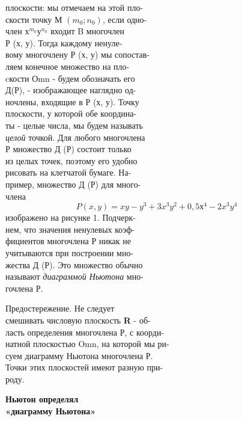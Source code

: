 \documentclass[12pt]{article}
\begin{document}
\begin{multicols}{2}
\begin{flushleft}
плоскости: мы отмечаем на этой пло-\\
скости точку М $(m_{0};n_{0})$, если одно-\\
член $х^{m_{0}}у^{n_{0}}$ входит B многочлен\\
Р (х, у). Тогда каждому ненуле-\\
вому многочлену Р (х, у) мы сопостав-\\
ляем конечное множество на пло-\\
cкости Оmn - будем обозначать его\\
Д(Р), - изображающее наглядно од-\\
ночлены, входящие в Р (х, у). Точку\\
плоскости, у которой обе координа-\\
ты - целые числа, мы будем называть\\
\textit{целой} точкой. Для любого многочлена\\
Р множество Д (Р) состоит только\\
из целых точек, поэтому его удобно\\
рисовать на клетчатой бумаге. На-\\
пример, множество Д (Р) для много-\\
члена
\begin{equation}
P (x, y) = xy-y^{3}+ 3 x^{3}y^{2} +0,5х^{4} - 2x^{3}y^{4}
\end{equation}
изображено на рисунке 1. Подчерк-\\
нем, что значения ненулевых коэф-\\
фициентов многочлена Р никак не\\
учитываются при построении мно-\\
жества Д (Р). Это множество обычно\\
называют \textit{диаграммой Ньютона} мно-\\
гочлена Р.
\end{flushleft}

Предостережение. Не следует\\
смешивать числовую плоскость \textbf{R} - об-\\
ласть определения многочлена Р, с коорди-\\
натной плоскостью Omn, на которой мы ри-\\
суем диаграмму Ньютона многочлена Р.\\
Точки этих плоскостей имеют разную при-\\
роду.

\begin{flushleft}
\textbf{ Ньютон определял\\«диаграмму Ньютона»}
\end{flushleft}


\end{multicols}
\end{document}
